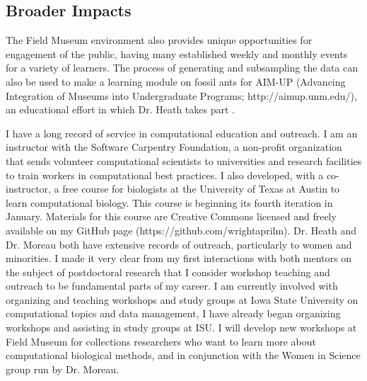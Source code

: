 \documentclass[]{article}
\begin{document}
\subsection*{Broader Impacts}
The Field Museum environment also provides unique opportunities for engagement of the public, having many established weekly and monthly events for a variety of learners. The process of generating and subsampling the data can also be used to make a learning module on fossil ants for AIM-UP (Advancing Integration of Museums into Undergraduate Programs; http://aimup.unm.edu/), an educational effort in which Dr. Heath takes part \citep{Cook01082014}. \par
 I have a long record of service in computational education and outreach. I am an instructor with the Software Carpentry Foundation, a non-profit organization that sends volunteer computational scientists to universities and research facilities to train workers in computational best practices. I also developed, with a co-instructor, a free course for biologists at the University of Texas at Austin to learn computational biology.  This course is beginning its fourth iteration in January. Materials for this course are Creative Commons licensed and freely available on my GitHub page (https://github.com/wrightaprilm). Dr. Heath and Dr. Moreau both have extensive records of outreach, particularly to women and minorities. I made it very clear from my first interactions with both mentors on the subject of postdoctoral research that I consider workshop teaching and outreach to be fundamental parts of my career. I am currently involved with organizing and teaching workshops and study groups at Iowa State University on computational topics and data management, I have already began organizing workshops and assisting in study groups at ISU. I will develop new workshops at Field Museum for collections researchers who want to learn more about computational biological methods, and in conjunction with the Women in Science group run by Dr. Moreau.  \par
\end{document}
